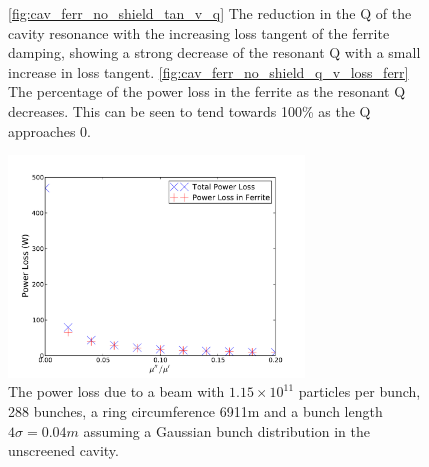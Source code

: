 \begin{figure}
\caption{\ref{fig:cav_ferr_no_shield_tan_v_q} The reduction in the Q of the cavity resonance with the increasing loss tangent of the ferrite damping, showing a strong decrease of the resonant Q with a small increase in loss tangent. \ref{fig:cav_ferr_no_shield_q_v_loss_ferr} The percentage of the power loss in the ferrite as the resonant Q decreases. This can be seen to tend towards 100\% as the Q approaches 0.}
\label{fig:no_screen_res_alterations}
\end{figure}

\begin{figure}
\begin{center}
\includegraphics[width=0.7\textwidth]{Beam_Coupling_Impedance_Reduction_Techniques/figures/no_screen_loss_tan_vs_power.pdf}
\end{center}
\caption{The power loss due to  a beam with $1.15 \times 10^{11}$ particles per bunch, 288 bunches, a ring circumference 6911m and a bunch length $4\sigma = 0.04m$ assuming a Gaussian bunch distribution in the unscreened cavity.}
\label{fig:no_screen_loss_tan_v_power}
\end{figure}

